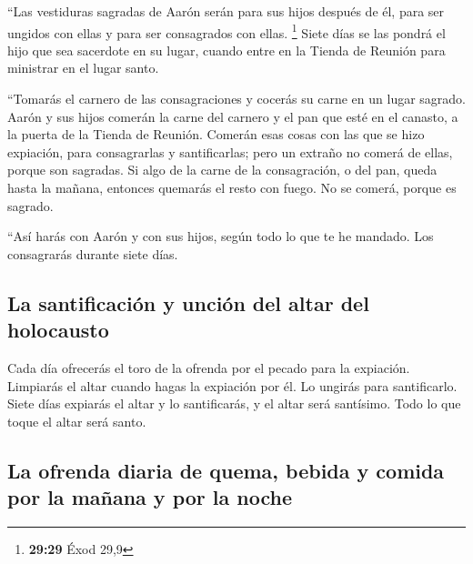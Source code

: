  ``Las vestiduras sagradas de Aarón serán para sus hijos
después de él, para ser ungidos con ellas y para ser consagrados con
ellas. \footnote{\textbf{29:29} Éxod 29,9}  Siete días se
las pondrá el hijo que sea sacerdote en su lugar, cuando entre en la
Tienda de Reunión para ministrar en el lugar santo.

 ``Tomarás el carnero de las consagraciones y cocerás su
carne en un lugar sagrado.  Aarón y sus hijos comerán la
carne del carnero y el pan que esté en el canasto, a la puerta de la
Tienda de Reunión.  Comerán esas cosas con las que se
hizo expiación, para consagrarlas y santificarlas; pero un extraño no
comerá de ellas, porque son sagradas.  Si algo de la
carne de la consagración, o del pan, queda hasta la mañana, entonces
quemarás el resto con fuego. No se comerá, porque es sagrado.

 ``Así harás con Aarón y con sus hijos, según todo lo que
te he mandado. Los consagrarás durante siete días.

\hypertarget{la-santificaciuxf3n-y-unciuxf3n-del-altar-del-holocausto}{%
\subsection{La santificación y unción del altar del
holocausto}\label{la-santificaciuxf3n-y-unciuxf3n-del-altar-del-holocausto}}

 Cada día ofrecerás el toro de la ofrenda por el pecado
para la expiación. Limpiarás el altar cuando hagas la expiación por él.
Lo ungirás para santificarlo.  Siete días expiarás el
altar y lo santificarás, y el altar será santísimo. Todo lo que toque el
altar será santo.

\hypertarget{la-ofrenda-diaria-de-quema-bebida-y-comida-por-la-mauxf1ana-y-por-la-noche}{%
\subsection{La ofrenda diaria de quema, bebida y comida por la mañana y
por la
noche}\label{la-ofrenda-diaria-de-quema-bebida-y-comida-por-la-mauxf1ana-y-por-la-noche}}


